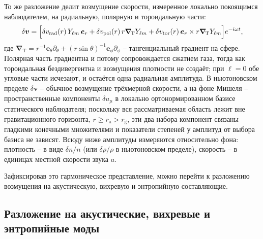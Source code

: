 \documentclass[12pt,a4paper,preprint,nopreprintline]{elsarticle}
\begin{document}
То же разложение делит возмущение скорости, измеренное локально покоящимся наблюдателем, на радиальную, полярную и тороидальную части:
\begin{equation}
    \delta\boldsymbol{v}
    =
    \Bigl[
        \delta v_{\mathrm{rad}}(r)\,Y_{\ell m}\,\boldsymbol{e}_{r}
        +
        \delta v_{\mathrm{pol}}(r)\,
        r\boldsymbol{\nabla}_{\!\mathrm{T}}Y_{\ell m}
        +
        \delta v_{\mathrm{tor}}(r)\,
        \boldsymbol{e}_{r}\times r\boldsymbol{\nabla}_{\!\mathrm{T}}Y_{\ell m}
    \Bigr]e^{-i\omega t},
    \label{eq:velocity_amplitudes}
\end{equation}
где $\boldsymbol{\nabla}_{\!\mathrm{T}}
=r^{-1}\boldsymbol{e}_{\theta}\partial_{\theta}
+(r\sin\theta)^{-1}\boldsymbol{e}_{\phi}\partial_{\phi}$ -- тангенциальный градиент на сфере. Полярная часть градиентна и потому сопровождается сжатием газа, тогда как тороидальная бездивергентна и возмущения плотности не создаёт; при $\ell=0$ обе угловые части исчезают, и остаётся одна радиальная амплитуда. В ньютоновском пределе $\delta\boldsymbol{v}$ -- обычное возмущение трёхмерной скорости, а на фоне Мишеля -- пространственные компоненты $\delta u_{\mu}$ в локально ортонормированном базисе статического наблюдателя; поскольку вся рассматриваемая область лежит вне гравитационного горизонта, $r\geq r_{\mathrm{a}}>r_{\mathrm{g}}$, эти два набора компонент связаны гладкими конечными множителями и показатели степеней у амплитуд от выбора базиса не зависят. Всюду ниже амплитуды измеряются относительно фона: плотность -- в виде $\delta n/n$ (или $\delta\rho/\rho$ в ньютоновском пределе), скорость -- в единицах местной скорости звука $a$.

Зафиксировав это гармоническое представление, можно перейти к разложению возмущения на акустическую, вихревую и энтропийную составляющие.

\subsection{Разложение на акустические, вихревые и энтропийные моды}
\label{sec:mode_decomposition}
\end{document}

